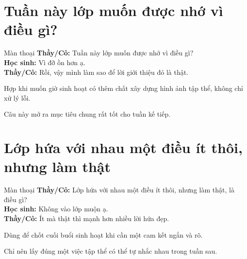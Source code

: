 \section{Tuần này lớp muốn được nhớ vì điều gì?}
\begin{manthoai}{Màn thoại}
\textbf{Thầy/Cô:} Tuần này lớp muốn được nhớ vì điều gì?\\
\textbf{Học sinh:} Vì đỡ ồn hơn ạ.\\
\textbf{Thầy/Cô:} Rồi, vậy mình làm sao để lời giới thiệu đó là thật.
\end{manthoai}
\begin{dungkhinào}
Hợp khi muốn giờ sinh hoạt có thêm chất xây dựng hình ảnh tập thể, không chỉ xử lý lỗi.
\end{dungkhinào}
\begin{nhipthem}
Câu này mở ra mục tiêu chung rất tốt cho tuần kế tiếp.
\end{nhipthem}
\ngancach

\section{Lớp hứa với nhau một điều ít thôi, nhưng làm thật}
\begin{manthoai}{Màn thoại}
\textbf{Thầy/Cô:} Lớp hứa với nhau một điều ít thôi, nhưng làm thật, là điều gì?\\
\textbf{Học sinh:} Không vào lớp muộn ạ.\\
\textbf{Thầy/Cô:} Ít mà thật thì mạnh hơn nhiều lời hứa đẹp.
\end{manthoai}
\begin{dungkhinào}
Dùng để chốt cuối buổi sinh hoạt khi cần một cam kết ngắn và rõ.
\end{dungkhinào}
\begin{nhipthem}
Chỉ nên lấy đúng một việc tập thể có thể tự nhắc nhau trong tuần sau.
\end{nhipthem}
